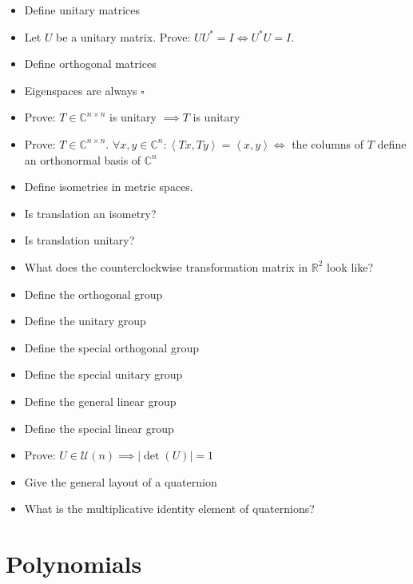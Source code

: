 \documentclass[a4paper]{article}
\newcommand{\ip}[2]{\left\langle#1,#2\right\rangle} %
\newcommand{\card}[1]{\left|#1\right|}
\begin{document}
\begin{itemize}
  \item Define unitary matrices
  \item Let $U$ be a unitary matrix. Prove: $UU^* = I \iff U^* U = I$.
  \item Define orthogonal matrices
  \item Eigenspaces are always $\square{}$
  \item Prove: $T \in \mathbb C^{n \times n}$ is unitary $\implies T$ is unitary
  \item Prove: $T \in \mathbb C^{n \times n}$. $\forall x,y \in \mathbb C^n: \ip{Tx}{Ty} = \ip xy \iff$ the columns of $T$ define an orthonormal basis of $\mathbb C^n$
  \item Define isometries in metric spaces.
  \item Is translation an isometry?
  \item Is translation unitary?
  \item What does the counterclockwise transformation matrix in $\mathbb R^2$ look like?
  \item Define the orthogonal group
  \item Define the unitary group
  \item Define the special orthogonal group
  \item Define the special unitary group
  \item Define the general linear group
  \item Define the special linear group
  \item Prove: $U \in \mathcal U(n) \implies \card{\det(U)} = 1$
  \item Give the general layout of a quaternion
  \item What is the multiplicative identity element of quaternions?
\end{itemize}

\section{Polynomials}
\end{document}
